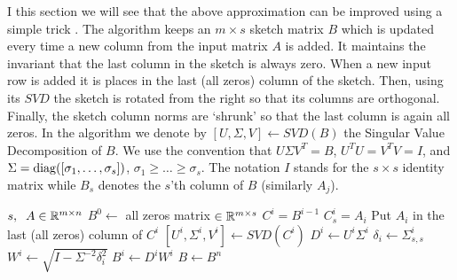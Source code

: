 \documentclass{article}
\begin{document}
I this section we will see that the above approximation can be improved using a simple trick \cite{LibertyMatrixSketching2012}.
The algorithm keeps an $m \times s$ sketch matrix $B$ which is updated
every time a new column from the input matrix $A$ is added. 
It maintains the invariant that the last column in the sketch is always zero.
When a new input row is added it is places in the last (all zeros) column of the sketch.
Then, using its $SVD$ the sketch is rotated from the right so that its columns are orthogonal.
Finally, the sketch column norms are `shrunk' so that the last column is again all zeros. 
In the algorithm we denote by $[U,\Sigma,V] \leftarrow SVD(B)$ the Singular Value Decomposition of $B$.
We use the convention that $U \Sigma V^T = B$, $U^{T}U = V^{T}V = I$, 
and $\Sigma = \operatorname{diag}([\sigma_1,\ldots,\sigma_s])$,  \;$\sigma_1 \ge \ldots \ge \sigma_s$.
The notation $I$ stands for the $s \times s$ identity matrix while $B_s$ denotes the $s$'th column of $B$ (similarly $A_j$).
\begin{algorithm} 
\label{alg}
\begin{algorithmic}
 $s, \;\;A \in {\mathbb{R}}^{m \times n}$ 
\STATE $B^{0} \leftarrow $ all zeros matrix $\in {\mathbb{R}}^{m \times s}$  
	\STATE $C^{i} = B^{i-1}$ \hfill %
	\STATE $C^{i}_{s} = A_i$ \hfill Put $A_i$ in the last (all zeros) column of $C^{i}$
	\STATE $[U^{i},\Sigma^{i},V^{i}] \leftarrow SVD(C^{i})$ %
	\STATE $D^{i} \leftarrow  U^{i}\Sigma^{i}$  %
	\STATE $\delta_i \leftarrow \Sigma^{i}_{s,s}$ %
	\STATE $W^{i} \leftarrow \sqrt{I - \Sigma^{-2}\delta^2_i}$
	\STATE $B^{i} \leftarrow D^{i}W^{i}$ %
\ENDFOR
{} $B \leftarrow B^{n}$ 
\end{algorithmic}
\end{algorithm}
\end{document}
